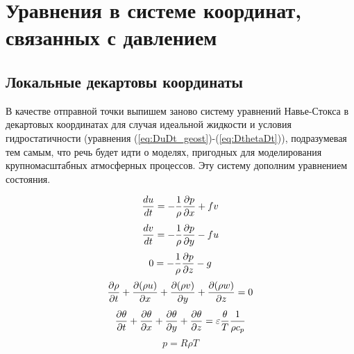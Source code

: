 \chapter{Уравнения в системе координат, связанных с давлением}

\section{{\color{done}Локальные декартовы координаты}}

    В качестве отправной точки выпишем заново систему уравнений Навье-Стокса в декартовых координатах для случая идеальной жидкости и условия гидростатичности (уравнения (\ref{eq:DuDt_geost})-(\ref{eq:DthetaDt})), подразумевая тем самым, что речь будет идти о моделях, пригодных для моделирования крупномасштабных атмосферных процессов. Эту систему дополним уравнением состояния.

    \begin{equation}
    \label{eq:ch6-DuDt_geost}
        \displaystyle\frac{d u}{d t} = -\frac{1}{\rho}\displaystyle\frac{\partial p}{\partial x}+fv 
    \end{equation} 
    \begin{equation}
    \label{eq:ch6-DvDt_geost}
        \displaystyle\frac{d v}{d t} = -\frac{1}{\rho}\displaystyle\frac{\partial p}{\partial y}-fu 
    \end{equation} 
    \begin{equation}
    \label{eq:ch6-DzDt_geost}
        0 = -\frac{1}{\rho}\displaystyle\frac{\partial p}{\partial z}-g 
    \end{equation} 
    \begin{equation}
    \label{eq:ch6-masscons}
        \displaystyle\frac{\partial \rho}{\partial t} + \displaystyle\frac{\partial (\rho u)}{\partial x} + \displaystyle\frac{\partial (\rho v)}{\partial y} + \displaystyle\frac{\partial (\rho w)}{\partial z} = 0 
    \end{equation} 
    \begin{equation}
    \label{eq:ch6-Tcons}
        \displaystyle\frac{\partial \theta}{\partial t} + \displaystyle\frac{\partial \theta}{\partial x} + \displaystyle\frac{\partial \theta}{\partial y} + \displaystyle\frac{\partial \theta}{\partial z} = \varepsilon\frac{\theta}{T} \frac{1}{\rho c_p} 
    \end{equation} 
    \begin{equation}
        \label{eq:ch6-idealGas}
        p = R\rho T
    \end{equation} 

